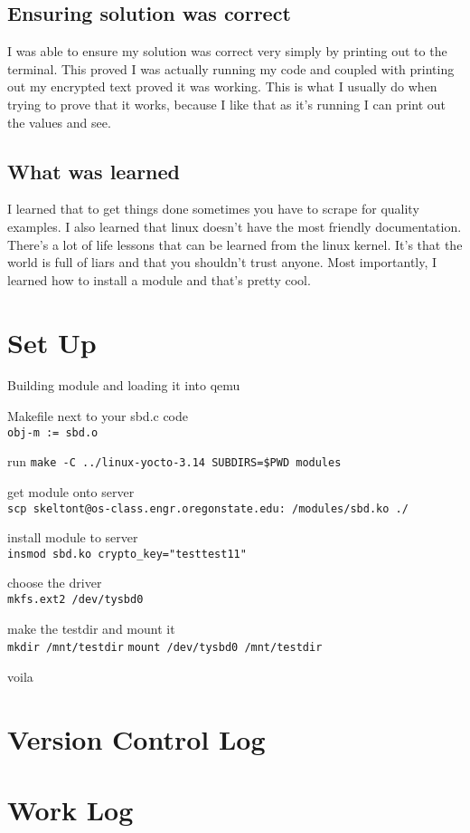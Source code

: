 \documentclass[10pt,draftclsnofoot,onecolumn]{IEEEtran}
\begin{document}
\subsection{Ensuring solution was correct}
I was able to ensure my solution was correct very simply by printing out to the terminal.
This proved I was actually running my code and coupled with printing out my encrypted text proved it was working.
This is what I usually do when trying to prove that it works, because I like that as it's running I can print out the values and see.

\subsection{What was learned}
I learned that to get things done sometimes you have to scrape for quality examples.
I also learned that linux doesn't have the most friendly documentation.
There's a lot of life lessons that can be learned from the linux kernel.
It's that the world is full of liars and that you shouldn't trust anyone.
Most importantly, I learned how to install a module and that's pretty cool.

\section{Set Up}
Building module and loading it into qemu
\begin{list}{-}{}
\item Makefile next to your sbd.c code \\
\texttt{obj-m := sbd.o}
\item run
\texttt{make -C ../linux-yocto-3.14 SUBDIRS=\$PWD modules}
\item get module onto server \\
\texttt{scp skeltont@os-class.engr.oregonstate.edu:~/modules/sbd.ko ./}
\item install module to server \\
\texttt{insmod sbd.ko crypto\_key="testtest11"}
\item choose the driver \\
\texttt{mkfs.ext2 /dev/tysbd0}
\item make the testdir and mount it \\
\texttt{mkdir /mnt/testdir}
\texttt{mount /dev/tysbd0 /mnt/testdir}
\item voila
\end{list}

\section{Version Control Log}


\section{Work Log}

\end{document}
